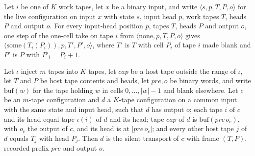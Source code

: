 \begin{theorem}
\label{Turing.NTimeDiag.dz_take_run}
\leanok
{}
Let $i$ be one of $K$ work tapes, let $x$ be a binary input, and write $\langle s, p, T, P,
o\rangle$ for the live configuration on input $x$ with state $s$, input head $p$, work tapes $T$,
heads $P$ and output $o$. For every input-head position $p$, tapes $T$, heads $P$ and output $o$,
one step of the one-cell take on tape $i$ from $\langle \mathrm{none}, p, T, P, o \rangle$ gives
$\langle \mathrm{some}(T_i(P_i)), p, T', P', o\rangle$, where $T'$ is $T$ with cell $P_i$ of tape
$i$ made blank and $P'$ is $P$ with $P'_i = P_i + 1$.
\end{theorem}

\begin{theorem}
\label{Turing.NTimeDiag.dz_silentCfg_eq}
\leanok
{}
Let $\iota$ inject $m$ tapes into $K$ tapes, let $\mathit{cap}$ be a host tape outside the range of
$\iota$, let $T$ and $P$ be host tape contents and heads, let $\mathit{pre}, o$ be binary words,
and write $\mathrm{buf}(w)$ for the tape holding $w$ in cells $0, \dots, |w| - 1$ and blank
elsewhere. Let $c$ be an $m$-tape configuration and $d$ a $K$-tape configuration on a common input
with the same state and input head, such that $d$ has output $o$; each tape $i$ of $c$ and its head
equal tape $\iota(i)$ of $d$ and its head; tape $\mathit{cap}$ of $d$ is
$\mathrm{buf}(\mathit{pre}\,o_c)$, with $o_c$ the output of $c$, and its head is at
$|\mathit{pre}\,o_c|$; and every other host tape $j$ of $d$ equals $T_j$ with head $P_j$. Then $d$
is the silent transport of $c$ with frame $(T, P)$, recorded prefix $\mathit{pre}$ and output $o$.
\end{theorem}


